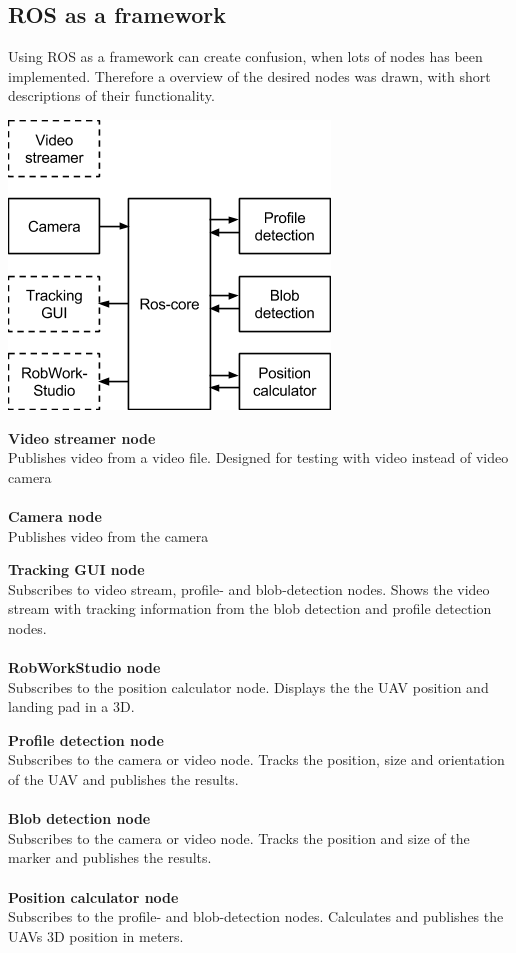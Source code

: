 \subsection{ROS as a framework}
Using ROS as a framework can create confusion, when lots of nodes has been implemented. Therefore a overview of the desired nodes was drawn, with short descriptions of their functionality.
\begin{center}
	\includegraphics{imgs/ros_setup}
\end{center} 

\begin{center}
	\begin{minipage}[t]{0.20\textwidth}
		\textbf{Video streamer node}\\Publishes video from a video file. Designed for testing with video instead of video camera\\\\
		\textbf{Camera node}\\Publishes video from the camera
	\end{minipage}
	\hfill
	\begin{minipage}[t]{0.31\textwidth}
		\textbf{Tracking GUI node}\\Subscribes to video stream, profile- and blob-detection nodes. Shows the video stream with tracking information from the blob detection and profile detection nodes. \\\\
		\textbf{RobWorkStudio node}\\Subscribes to the position calculator node. Displays the the UAV position and landing pad in a 3D.
	\end{minipage}
	\hfill
	\begin{minipage}[t]{0.45\textwidth}
		\textbf{Profile detection node}\\Subscribes to the camera or video node. Tracks the position, size and orientation of the UAV and publishes the results.\\\\
		\textbf{Blob detection node}\\Subscribes to the camera or video node. Tracks the position and size of the marker and publishes the results.\\\\
		\textbf{Position calculator node}\\Subscribes to the profile- and blob-detection nodes. Calculates and publishes the UAVs 3D position in meters.
	\end{minipage}
\end{center}
